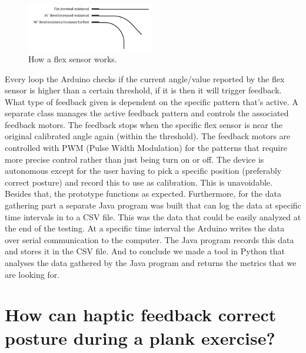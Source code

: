 \documentclass[sigconf]{acmart}
\begin{document}
\begin{figure}[htbp]
\centering
\includegraphics[width=0.5\textwidth, scale=1]{FlexSensor_work.jpg}
\caption{How a flex sensor works.}
\end{figure}




Every loop the Arduino checks if the current angle/value reported by the flex sensor is higher than a certain threshold, if it is then it will trigger feedback. What type of feedback given is dependent on the specific pattern that's active. A separate class manages the active feedback pattern and controls the associated feedback motors. The feedback stops when the specific flex sensor is near the original calibrated angle again (within the threshold). The feedback motors are controlled with PWM (Pulse Width Modulation) for the patterns that require more precise control rather than just being turn on or off.
The device is autonomous except for the user having to pick a specific position (preferably correct posture) and record this to use as calibration. This is unavoidable. Besides that, the prototype functions as expected.
Furthermore, for the data gathering part a separate Java program was built that can log the data at specific time intervals in to a CSV file. This was the data that could be easily analyzed at the end of the testing. At a specific time interval the Arduino writes the data over serial communication to the computer. The Java program records this data and stores it in the CSV file.
And to conclude we made a tool in Python that analyses the data gathered by the Java program and returns the metrics that we are looking for.\\




\section{How can haptic feedback correct posture during a plank exercise?}
\end{document}
